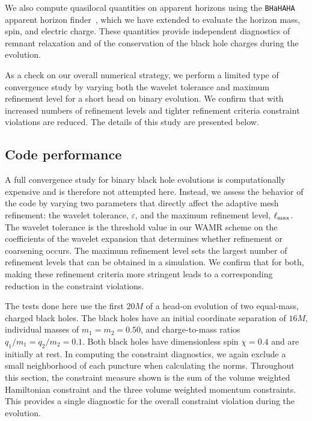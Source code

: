 We also compute quasilocal quantities on apparent horizons using the
\texttt{BHaHAHA} apparent horizon finder~\cite{Etienne2026BHaHAHA}, which
we have extended to evaluate the horizon mass, spin, and electric charge.
These quantities provide independent diagnostics of remnant relaxation and
of the conservation of the black hole charges during the evolution.

As a check on our overall numerical strategy, we perform a limited type of convergence study by varying both the wavelet
tolerance and maximum refinement level for a short head on binary evolution.  We confirm that with increased numbers of refinement levels and tighter refinement criteria constraint violations are reduced.  
The details of this study are presented below.

\subsection{Code performance}
\label{sec:code_performance}
A full convergence study for binary black hole evolutions is computationally expensive and is therefore not attempted here. Instead, we assess the behavior of the code by varying two parameters that directly affect the adaptive mesh refinement: the wavelet tolerance, $\varepsilon$, and the maximum refinement level, $\ell_{\rm max}$. The wavelet tolerance is the threshold value in our WAMR scheme on the  coefficients of the wavelet expansion that determines whether refinement or coarsening occurs.  The maximum refinement level sets the largest number of refinement levels that can be obtained in a simulation.  We confirm that for both, making these refinement criteria more stringent leads to a corresponding reduction in the constraint violations.

The tests done here use the first \(20M\) of a head-on evolution of two equal-mass, charged black holes. The black holes have an initial coordinate separation of $16M$, individual masses of \(m_1=m_2=0.50\), and charge-to-mass ratios \(q_1/m_1=q_2/m_2=0.1\). Both black holes have dimensionless spin \(\chi=0.4\) and are initially at rest. In computing the constraint diagnostics, we again exclude a small neighborhood of each puncture when calculating the norms.
Throughout this section, the constraint measure shown is the sum of the volume weighted Hamiltonian constraint and the three volume weighted momentum constraints. This provides a single diagnostic for the overall constraint violation during the evolution.

